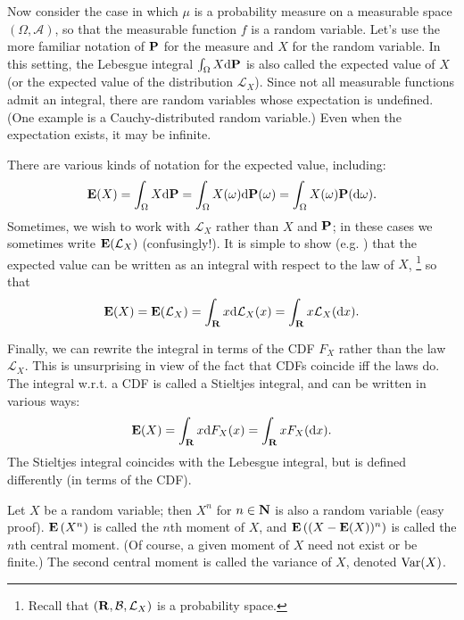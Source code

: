 \documentclass[11pt,letterpaper,reqno,oneside]{article}
\begin{document}
Now consider the case in which $\mu$ is a probability measure on a measurable space $(\Omega,\mathcal{A})$, so that the measurable function $f$ is a random variable. Let's use the more familiar notation of $\mathbf{P}$ for the measure and $X$ for the random variable. In this setting, the Lebesgue integral $\int_\Omega X \mathrm{d} \mathbf{P}$ is also called the expected value of $X$ (or the expected value of the distribution $\mathcal{L}_X$).
Since not all measurable functions admit an integral, there are random variables whose expectation is undefined. (One example is a Cauchy-distributed random variable.)
Even when the expectation exists, it may be infinite.

There are various kinds of notation for the expected value, including:
%
\begin{equation*}
	\mathbf{E}( X ) 
	= \int_\Omega X \mathrm{d}\mathbf{P}
	= \int_\Omega X(\omega) \mathrm{d}\mathbf{P}(\omega)
	= \int_\Omega X(\omega) \mathbf{P}(\mathrm{d}\omega) .
\end{equation*}
%
Sometimes, we wish to work with $\mathcal{L}_X$ rather than $X$ and $\mathbf{P}$; in these cases we sometimes write $\mathbf{E}(\mathcal{L}_X)$ (confusingly!). It is simple to show (e.g. \textcite[][Theorem 6.1.1]{Rosenthal2006}) that the expected value can be written as an integral with respect to the law of $X$,%
	\footnote{Recall that $(\mathbf{R},\mathcal{B},\mathcal{L}_X)$ is a probability space.}
so that
%
\begin{equation*}
	\mathbf{E}(X)
	= \mathbf{E}( \mathcal{L}_X )
	= \int_{\mathbf{R}} x \mathrm{d} \mathcal{L}_X(x) 
	= \int_{\mathbf{R}} x \mathcal{L}_X(\mathrm{d} x) . 
\end{equation*}


Finally, we can rewrite the integral in terms of the CDF $F_X$ rather than the law $\mathcal{L}_X$. This is unsurprising in view of the fact that CDFs coincide iff the laws do. The integral w.r.t. a CDF is called a Stieltjes integral, and can be written in various ways:
%
\begin{equation*}
	\mathbf{E}( X )
	= \int_{\mathbf{R}} x \mathrm{d} F_X(x) 
	= \int_{\mathbf{R}} x F_X(\mathrm{d} x) . 
\end{equation*}
%
The Stieltjes integral coincides with the Lebesgue integral, but is defined differently (in terms of the CDF).

Let $X$ be a random variable; then $X^n$ for $n \in \mathbf{N}$ is also a random variable (easy proof). $\mathbf{E}\left( X^n \right)$ is called the $n$th moment of $X$, and $\mathbf{E}\left( (X-\mathbf{E}(X))^n \right)$ is called the $n$th central moment. (Of course, a given moment of $X$ need not exist or be finite.) The second central moment is called the variance of $X$, denoted $\mathrm{Var}(X)$.
\end{document}
